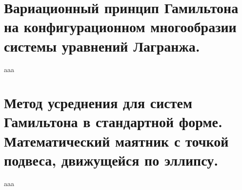 \documentclass[specialist, subf, href, colorlinks=true, 12pt, times, mtpro, final]{disser}
\theoremstyle{definition}
\begin{document}
    \section{Вариационный принцип Гамильтона на конфигурационном многообразии системы уравнений Лагранжа.}
     \label{25}
    aaa
    
    \section{Метод усреднения для систем Гамильтона в стандартной форме. Математический маятник с точкой подвеса, движущейся по эллипсу.}
     \label{26}
    aaa
    
    
\end{document}
